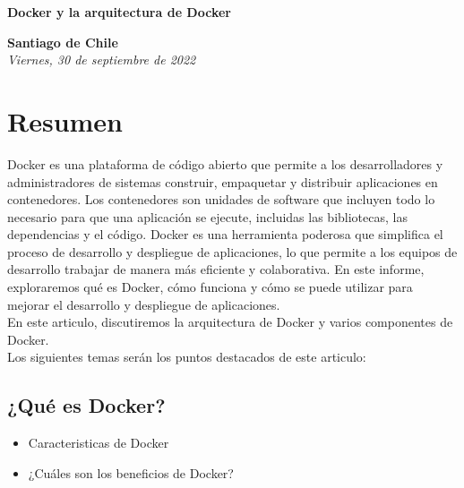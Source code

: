 \documentclass[12pt]{article}
\begin{document}
\onehalfspacing %

\begin{center}
    \vspace*{8cm}
    {\Huge \textbf{\sffamily Docker y la arquitectura de Docker}}\\[0.5em]
\end{center}

\begin{center}
    \vspace{9cm}
    \textcolor{secondary}{\textbf{Santiago de Chile}}\\
    \textit{Viernes, 30 de septiembre de 2022}
    \vspace{1cm}
\end{center}

\newpage

\tableofcontents
\newpage

\section{Resumen}
\noindent
Docker es una plataforma de código abierto que permite a los desarrolladores y administradores de sistemas construir, empaquetar y distribuir aplicaciones en contenedores. Los contenedores son unidades de software que incluyen todo lo necesario para que una aplicación se ejecute, incluidas las bibliotecas, las dependencias y el código. Docker es una herramienta poderosa que simplifica el proceso de desarrollo y despliegue de aplicaciones, lo que permite a los equipos de desarrollo trabajar de manera más eficiente y colaborativa. En este informe, exploraremos qué es Docker, cómo funciona y cómo se puede utilizar para mejorar el desarrollo y despliegue de aplicaciones.\\

\noindent
En este articulo, discutiremos la arquitectura de Docker y varios componentes de Docker.\\

\noindent
Los siguientes temas serán los puntos destacados de este articulo:

\subsection{¿Qué es Docker?}
\begin{itemize}
    \item Caracteristicas de Docker
    \item ¿Cuáles son los beneficios de Docker?
\end{itemize}
\end{document}
